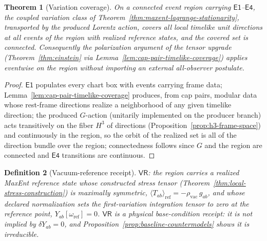 \documentclass[11pt]{article}
\newtheorem{theorem}{Theorem}[section]
\newtheorem{definition}[theorem]{Definition}
\begin{document}
\begin{theorem}[Variation coverage]
\label{thm:variation-coverage}
On a connected event region carrying \(\mathsf{E1}\)--\(\mathsf{E4}\), the
coupled variation class of Theorem~\ref{thm:maxent-lagrange-stationarity},
transported by the produced Lorentz action, covers all local timelike unit
directions at all events of the region with realized reference states, and
the covered set is connected. Consequently the polarization argument of the
tensor upgrade (Theorem~\ref{thm:einstein} via
Lemma~\ref{lem:cap-pair-timelike-coverage}) applies eventwise on the region
without importing an external all-observer postulate.
\end{theorem}

\begin{proof}
\(\mathsf{E1}\) populates every chart box with events carrying frame data;
Lemma~\ref{lem:cap-pair-timelike-coverage} produces, from cap pairs, modular
data whose rest-frame directions realize a neighborhood of any given
timelike direction; the produced \(G\)-action (unitarily implemented on the
producer branch) acts transitively on the fiber \(H^3\) of directions
(Proposition~\ref{prop:h3-frame-space}) and continuously in the region, so
the orbit of the realized set is all of the direction bundle over the
region; connectedness follows since \(G\) and the region are connected and
\(\mathsf{E4}\) transitions are continuous.
\end{proof}

\begin{definition}[Vacuum-reference receipt]
\label{def:vacuum-reference-receipt}
\(\mathsf{VR}\): the region carries a realized MaxEnt reference state whose
constructed stress tensor (Theorem~\ref{thm:local-stress-construction}) is
maximally symmetric,
\(\langle T_{ab}\rangle_{\mathrm{ref}}=-\rho_{\mathrm{vac}}\,g_{ab}\), and
whose declared normalization sets the first-variation integration tensor to
zero at the reference point,
\(Y_{ab}[\omega_{\mathrm{ref}}]=0\). \(\mathsf{VR}\) is a physical
base-condition receipt: it is \emph{not} implied by
\(\delta Y_{ab}=0\), and Proposition~\ref{prop:baseline-countermodels} shows
it is irreducible.
\end{definition}
\end{document}
